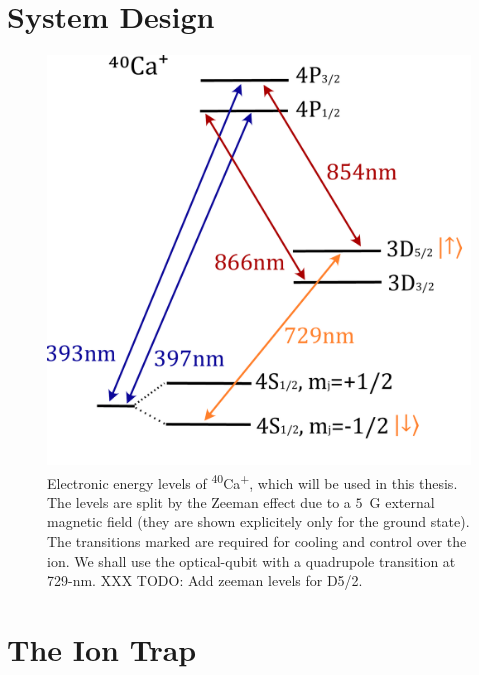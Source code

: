 \section{System Design}
\label{sec:System Design}

    \begin{figure}[ht]
        \begin{center}
        \noindent\includegraphics[width=0.4\linewidth]{figures/pdf_figure/Ca40.pdf}
        \end{center}
        \caption{
        Electronic energy levels of \textsuperscript{40}Ca\textsuperscript{+},
        which will be used in this thesis. The levels are
        split by the Zeeman effect due to a $5$~G external magnetic field (they are shown explicitely only for the ground state). The
        transitions marked are required for cooling and control over the
        ion. We shall use the optical-qubit with a quadrupole transition at
        729-nm. XXX TODO: Add zeeman levels for D5/2.
        }

    \label{fig:ion}
    \end{figure}

\section{The Ion Trap}
\label{sec:The Ion Trap}

